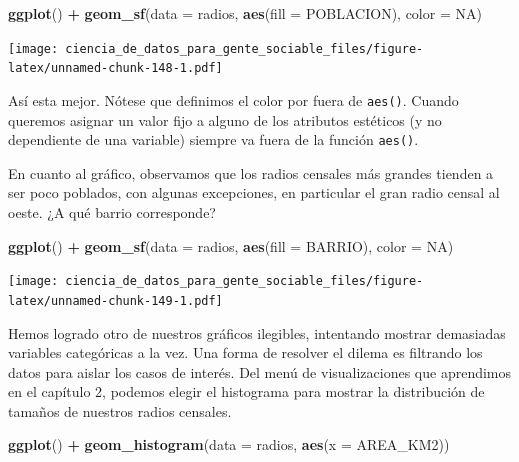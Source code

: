 \documentclass[]{book}
\newenvironment{Shaded}{\begin{snugshade}}{\end{snugshade}}
\newcommand{\KeywordTok}[1]{\textcolor[rgb]{0.13,0.29,0.53}{\textbf{#1}}}
\newcommand{\DataTypeTok}[1]{\textcolor[rgb]{0.13,0.29,0.53}{#1}}
\newcommand{\StringTok}[1]{\textcolor[rgb]{0.31,0.60,0.02}{#1}}
\newcommand{\OtherTok}[1]{\textcolor[rgb]{0.56,0.35,0.01}{#1}}
\newcommand{\OperatorTok}[1]{\textcolor[rgb]{0.81,0.36,0.00}{\textbf{#1}}}
\newcommand{\NormalTok}[1]{#1}
\begin{document}
\begin{Shaded}
\begin{Highlighting}[]
\KeywordTok{ggplot}\NormalTok{() }\OperatorTok{+}\StringTok{ }\KeywordTok{geom_sf}\NormalTok{(}\DataTypeTok{data =}\NormalTok{ radios, }\KeywordTok{aes}\NormalTok{(}\DataTypeTok{fill =}\NormalTok{ POBLACION), }\DataTypeTok{color =} \OtherTok{NA}\NormalTok{)}
\end{Highlighting}
\end{Shaded}

\texttt{[image: ciencia\_de\_datos\_para\_gente\_sociable\_files/figure-latex/unnamed-chunk-148-1.pdf]}

Así esta mejor. Nótese que definimos el color por fuera de
\texttt{aes()}. Cuando queremos asignar un valor fijo a alguno de los
atributos estéticos (y no dependiente de una variable) siempre va fuera
de la función \texttt{aes()}.

En cuanto al gráfico, observamos que los radios censales más grandes
tienden a ser poco poblados, con algunas excepciones, en particular el
gran radio censal al oeste. ¿A qué barrio corresponde?

\begin{Shaded}
\begin{Highlighting}[]
\KeywordTok{ggplot}\NormalTok{() }\OperatorTok{+}\StringTok{ }\KeywordTok{geom_sf}\NormalTok{(}\DataTypeTok{data =}\NormalTok{ radios, }\KeywordTok{aes}\NormalTok{(}\DataTypeTok{fill =}\NormalTok{ BARRIO), }\DataTypeTok{color =} \OtherTok{NA}\NormalTok{)}
\end{Highlighting}
\end{Shaded}

\texttt{[image: ciencia\_de\_datos\_para\_gente\_sociable\_files/figure-latex/unnamed-chunk-149-1.pdf]}

Hemos logrado otro de nuestros gráficos ilegibles, intentando mostrar
demasiadas variables categóricas a la vez. Una forma de resolver el
dilema es filtrando los datos para aislar los casos de interés. Del menú
de visualizaciones que aprendimos en el capítulo 2, podemos elegir el
histograma para mostrar la distribución de tamaños de nuestros radios
censales.

\begin{Shaded}
\begin{Highlighting}[]
\KeywordTok{ggplot}\NormalTok{() }\OperatorTok{+}\StringTok{ }\KeywordTok{geom_histogram}\NormalTok{(}\DataTypeTok{data =}\NormalTok{ radios, }\KeywordTok{aes}\NormalTok{(}\DataTypeTok{x =}\NormalTok{ AREA_KM2))}
\end{Highlighting}
\end{Shaded}
\end{document}
